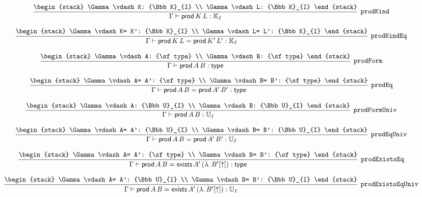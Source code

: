 \[
\infer[{\tt prodKind}]{\Gamma \vdash {\sf prod}\,K\,L: {\Bbb K}_{I}}{
\begin{stack}
\Gamma \vdash K: {\Bbb K}_{I}
\\
\Gamma \vdash L: {\Bbb K}_{I}
\end{stack}}
\]

\[
\infer[{\tt prodKindEq}]{\Gamma \vdash {\sf prod}\,K\,L= {\sf prod}\,K'\,L': {\Bbb K}_{I}}{
\begin{stack}
\Gamma \vdash K= K': {\Bbb K}_{I}
\\
\Gamma \vdash L= L': {\Bbb K}_{I}
\end{stack}}
\]

\[
\infer[{\tt prodForm}]{\Gamma \vdash {\sf prod}\,A\,B: {\sf type}}{
\begin{stack}
\Gamma \vdash A: {\sf type}
\\
\Gamma \vdash B: {\sf type}
\end{stack}}
\]

\[
\infer[{\tt prodEq}]{\Gamma \vdash {\sf prod}\,A\,B= {\sf prod}\,A'\,B': {\sf type}}{
\begin{stack}
\Gamma \vdash A= A': {\sf type}
\\
\Gamma \vdash B= B': {\sf type}
\end{stack}}
\]

\[
\infer[{\tt prodFormUniv}]{\Gamma \vdash {\sf prod}\,A\,B: {\Bbb U}_{I}}{
\begin{stack}
\Gamma \vdash A: {\Bbb U}_{I}
\\
\Gamma \vdash B: {\Bbb U}_{I}
\end{stack}}
\]

\[
\infer[{\tt prodEqUniv}]{\Gamma \vdash {\sf prod}\,A\,B= {\sf prod}\,A'\,B': {\Bbb U}_{I}}{
\begin{stack}
\Gamma \vdash A= A': {\Bbb U}_{I}
\\
\Gamma \vdash B= B': {\Bbb U}_{I}
\end{stack}}
\]

\[
\infer[{\tt prodExistsEq}]{\Gamma \vdash {\sf prod}\,A\,B= {\sf exists}\,A'\,(\lambda .\,B'[\uparrow ]): {\sf type}}{
\begin{stack}
\Gamma \vdash A= A': {\sf type}
\\
\Gamma \vdash B= B': {\sf type}
\end{stack}}
\]

\[
\infer[{\tt prodExistsEqUniv}]{\Gamma \vdash {\sf prod}\,A\,B= {\sf exists}\,A'\,(\lambda .\,B'[\uparrow ]): {\Bbb U}_{I}}{
\begin{stack}
\Gamma \vdash A= A': {\Bbb U}_{I}
\\
\Gamma \vdash B= B': {\Bbb U}_{I}
\end{stack}}
\]

